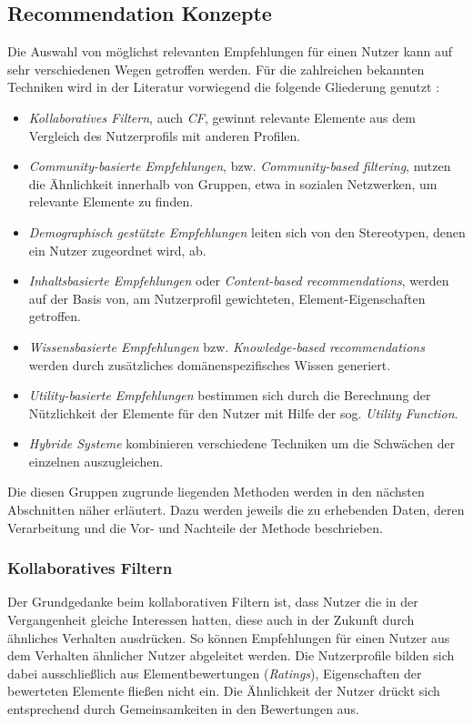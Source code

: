 \subsection{Recommendation Konzepte}
Die Auswahl von möglichst relevanten Empfehlungen für einen Nutzer kann auf sehr verschiedenen Wegen getroffen werden. Für die zahlreichen bekannten Techniken wird in der Literatur vorwiegend die folgende Gliederung genutzt \citep[Kap. 1]{hb} \citep{Burke:2002:HRS:586321.586352} \citep{rs}:

\begin{itemize}
\item \textit{Kollaboratives Filtern}, auch \textit{\acf{CF}}, gewinnt relevante Elemente aus dem Vergleich des Nutzerprofils mit anderen Profilen.
\item \textit{Community-basierte Empfehlungen}, bzw. \textit{Community-based filtering}, nutzen die Ähnlichkeit innerhalb von Gruppen, etwa in sozialen Netzwerken, um relevante Elemente zu finden.
\item \textit{Demographisch gestützte Empfehlungen} leiten sich von den Stereotypen, denen ein Nutzer zugeordnet wird, ab.
\item \textit{Inhaltsbasierte Empfehlungen} oder \textit{Content-based recommendations}, werden auf der Basis von, am Nutzerprofil gewichteten, Element-Eigenschaften getroffen.
\item \textit{Wissensbasierte Empfehlungen} bzw. \textit{Knowledge-based recommendations} werden durch zusätzliches domänenspezifisches Wissen generiert.
\item \textit{Utility-basierte Empfehlungen} bestimmen sich durch die Berechnung der Nützlichkeit der Elemente für den Nutzer mit Hilfe der sog. \textit{Utility Function}.
\item \textit{Hybride Systeme} kombinieren verschiedene Techniken um die Schwächen der einzelnen auszugleichen.
\end{itemize}

Die diesen Gruppen zugrunde liegenden Methoden werden in den nächsten Abschnitten näher erläutert. Dazu werden jeweils die zu erhebenden Daten, deren Verarbeitung und die Vor- und Nachteile der Methode beschrieben. %

\subsubsection{Kollaboratives Filtern}
\label{sec:cf_overview}
Der Grundgedanke beim kollaborativen Filtern ist, dass Nutzer die in der Vergangenheit gleiche Interessen hatten, diese auch in der Zukunft durch ähnliches Verhalten ausdrücken. So können Empfehlungen für einen Nutzer aus dem Verhalten ähnlicher Nutzer abgeleitet werden. Die Nutzerprofile bilden sich dabei ausschließlich aus Elementbewertungen (\textit{Ratings}), Eigenschaften der bewerteten Elemente fließen nicht ein.  Die Ähnlichkeit der Nutzer drückt sich entsprechend durch Gemeinsamkeiten in den Bewertungen aus. \citep[Kap. 2]{rs}

